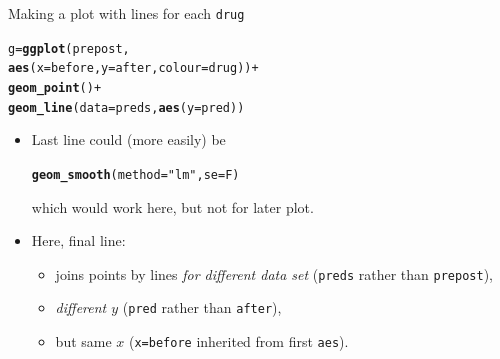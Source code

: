 \documentclass[unknownkeysallowed]{beamer}\usepackage[]{graphicx}\usepackage[]{color}
\makeatletter
\newcommand{\hlstr}[1]{\textcolor[rgb]{0.192,0.494,0.8}{#1}}%
\newcommand{\hlopt}[1]{\textcolor[rgb]{0,0,0}{#1}}%
\newcommand{\hlstd}[1]{\textcolor[rgb]{0.345,0.345,0.345}{#1}}%
\newcommand{\hlkwb}[1]{\textcolor[rgb]{0.69,0.353,0.396}{#1}}%
\newcommand{\hlkwc}[1]{\textcolor[rgb]{0.333,0.667,0.333}{#1}}%
\newcommand{\hlkwd}[1]{\textcolor[rgb]{0.737,0.353,0.396}{\textbf{#1}}}%
\newenvironment{kframe}{%
 \def\at@end@of@kframe{}%
 \ifinner\ifhmode%
  \def\at@end@of@kframe{\end{minipage}}%
  \begin{minipage}{\columnwidth}%
 \fi\fi%
 \def\FrameCommand##1{\hskip\@totalleftmargin \hskip-\fboxsep
 \colorbox{shadecolor}{##1}\hskip-\fboxsep
     \hskip-\linewidth \hskip-\@totalleftmargin \hskip\columnwidth}%
 \MakeFramed {\advance\hsize-\width
   \@totalleftmargin\z@ \linewidth\hsize
   \@setminipage}}%
 {\par\unskip\endMakeFramed%
 \at@end@of@kframe}
\newenvironment{knitrout}{}{} %
\makeatother
\begin{document}
\begin{frame}[fragile]{Making a plot with lines for each \texttt{drug}}

 
\begin{knitrout}
\color{fgcolor}\begin{kframe}
\begin{alltt}
\hlstd{g}\hlkwb{=}\hlkwd{ggplot}\hlstd{(prepost,}
  \hlkwd{aes}\hlstd{(}\hlkwc{x}\hlstd{=before,}\hlkwc{y}\hlstd{=after,}\hlkwc{colour}\hlstd{=drug))}\hlopt{+}
  \hlkwd{geom_point}\hlstd{()}\hlopt{+}
  \hlkwd{geom_line}\hlstd{(}\hlkwc{data}\hlstd{=preds,}\hlkwd{aes}\hlstd{(}\hlkwc{y}\hlstd{=pred))}
\end{alltt}


{\ttfamily\noindent\bfseries\color{errorcolor}{\#\# Error in ggplot(prepost, aes(x = before, y = after, colour = drug)): object 'prepost' not found}}\end{kframe}
\end{knitrout}


\begin{itemize}
\item Last line could (more easily) be 

\begin{knitrout}
\color{fgcolor}\begin{kframe}
\begin{alltt}
\hlkwd{geom_smooth}\hlstd{(}\hlkwc{method}\hlstd{=}\hlstr{"lm"}\hlstd{,}\hlkwc{se}\hlstd{=F)}
\end{alltt}
\end{kframe}
\end{knitrout}

which would work here, but not for later plot.
\item Here, final line:
  \begin{itemize}
  \item   joins points by lines \emph{for different data
    set} (\texttt{preds} rather than \texttt{prepost}),
\item   \emph{different $y$} (\texttt{pred} rather than \texttt{after}),
  
\item but same $x$ (\texttt{x=before} inherited from first \texttt{aes}).

  \end{itemize}
  
\end{itemize}
  
  
\end{frame}
\end{document}
